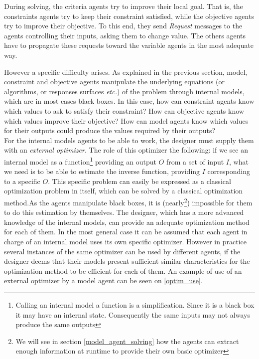 During solving, the criteria agents try to improve their local goal. That is, the constraints agents try to keep their constraint satisfied, while the objective agents try to improve their objective. To this end, they send \emph{Request} messages to the agents controlling their inputs, asking them to change value. The others agents have to propagate these requests toward the variable agents in the most adequate way.

However a specific difficulty arises. As explained in the previous section, model, constraint and objective agents manipulate the underlying equations (or algorithms, or responses surfaces \emph{etc.}) of the problem through internal models, which are in most cases black boxes. In this case, how can constraint agents know which values to ask to satisfy their constraint? How can objective agents know which values improve their objective? How can model agents know which values for their outputs could produce the values required by their outputs?\\
For the internal models agents to be able to work, the designer must supply them with an \emph{external optimizer}. The role of this optimizer the following: if we see an internal model as a function\footnote{Calling an internal model a function is a simplification. Since it is a black box it may have an internal state. Consequently the same inputs may not always produce the same outputs} providing an output $O$ from a set of input $I$, what we need is to be able to estimate the inverse function, providing $I$ corresponding to a specific $O$. This specific problem can easily be expressed as a classical optimization problem in itself, which can be solved by a classical optimization method.As the agents manipulate black boxes, it is (nearly\footnote{We will see in section \ref{model_agent_solving} how the agents can extract enough information at runtime to provide their own basic optimizer}) impossible for them to do this estimation by themselves. The designer, which has a more advanced knowledge of the internal models, can provide an adequate optimization method for each of them. In the most general case it can be assumed that each agent in charge of an internal model uses its own specific optimizer. However in practice several instances of the same optimizer can be used by different agents, if the designer deems that their models present sufficient similar characteristics for the optimization method to be efficient for each of them. An example of use of an external optimizer by a model agent can be seen on \figurename{} \ref{optim_use}.

